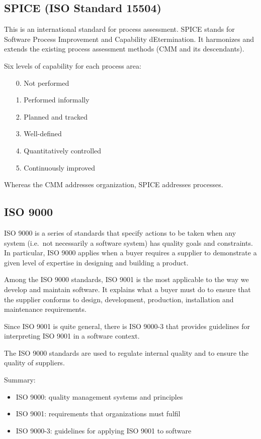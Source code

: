 \subsection{SPICE (ISO Standard 15504)}

This is an international standard for process assessment. SPICE stands for
Software Process Improvement and Capability dEtermination. \newline
It harmonizes and extends the existing process assessment methods (CMM and its
descendants). \newline

Six levels of capability for each process area:
\begin{itemize}
    \item[0.] Not performed
    \item[1.] Performed informally
    \item[2.] Planned and tracked
    \item[3.] Well-defined
    \item[4.] Quantitatively controlled
    \item[5.] Continuously improved
\end{itemize}

Whereas the CMM addresses organization, SPICE addresses processes.

\subsection{ISO 9000}

ISO 9000 is a series of standards that specify actions to be taken when any
system (i.e.\ not necessarily a software system) has quality goals and
constraints. In particular, ISO 9000 applies when a buyer requires a supplier
to demonstrate a given level of expertise in designing and building a product.
\newline

Among the ISO 9000 standards, ISO 9001 is the most applicable to the way we develop and
maintain software. It explains what a buyer must do to ensure that the supplier conforms to
design, development, production, installation and maintenance requirements.
\newline

Since ISO 9001 is quite general, there is ISO 9000-3 that provides guidelines for interpreting
ISO 9001 in a software context.
\newline

The ISO 9000 standards are used to regulate internal quality and to ensure the quality of
suppliers.
\newline

Summary:
\begin{itemize}
    \item ISO 9000: quality management systems and principles
    \item ISO 9001: requirements that organizations must fulfil
    \item ISO 9000-3: guidelines for applying ISO 9001 to software
\end{itemize}
